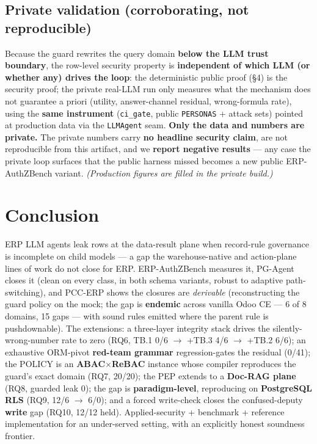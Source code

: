 \documentclass[runningheads]{llncs}
\newcommand{\code}[1]{\texttt{#1}}
\begin{document}
\subsection{Private validation (corroborating, not reproducible)}
Because the guard rewrites the query domain \textbf{below the LLM trust boundary}, the row-level security property
is \textbf{independent of which LLM (or whether any) drives the loop}: the deterministic public proof (\S4) is the
security proof; the private real-LLM run only measures what the mechanism does not guarantee a priori (utility,
answer-channel residual, wrong-formula rate), using the \textbf{same instrument} (\code{ci\_gate}, public
\code{PERSONAS} + attack sets) pointed at production data via the \code{LLMAgent} seam. \textbf{Only the data and
numbers are private.} The private numbers carry \textbf{no headline security claim}, are not reproducible from this
artifact, and we \textbf{report negative results} --- any case the private loop surfaces that the public harness
missed becomes a new public ERP-AuthZBench variant. \emph{(Production figures are filled in the private build.)}

\section{Conclusion}
ERP LLM agents leak rows at the data-result plane when record-rule governance is incomplete on child models ---
a gap the warehouse-native and action-plane lines of work do not close for ERP. ERP-AuthZBench measures it,
PG-Agent closes it (clean on every class, in both schema variants, robust to adaptive path-switching), and
PCC-ERP shows the closures are \emph{derivable} (reconstructing the guard policy on the mock; the gap is
\textbf{endemic} across vanilla Odoo CE --- 6 of 8 domains, 15 gaps --- with sound rules emitted where the parent
rule is pushdownable). The extensions: a three-layer integrity stack drives the silently-wrong-number rate to zero
(RQ6, TB.1 0/6 $\to$ +TB.3 4/6 $\to$ +TB.2 6/6); an exhaustive ORM-pivot \textbf{red-team grammar} regression-gates
the residual (0/41); the POLICY is an \textbf{ABAC$\times$ReBAC} instance whose compiler reproduces the guard's
exact domain (RQ7, 20/20); the PEP extends to a \textbf{Doc-RAG plane} (RQ8, guarded leak 0); the gap is
\textbf{paradigm-level}, reproducing on \textbf{PostgreSQL RLS} (RQ9, 12/6 $\to$ 6/0); and a forced write-check
closes the confused-deputy \textbf{write} gap (RQ10, 12/12 held). Applied-security + benchmark + reference
implementation for an under-served setting, with an explicitly honest soundness frontier.



\end{document}
